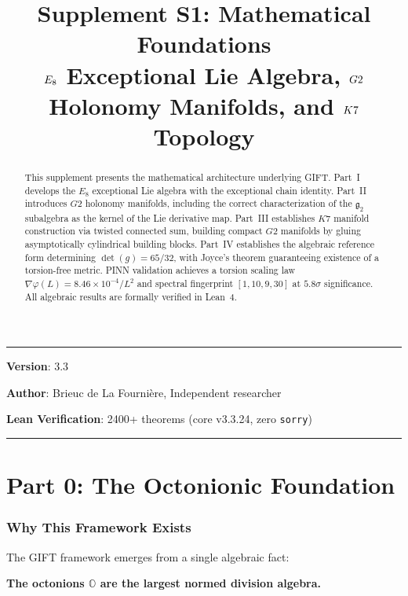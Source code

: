\documentclass[11pt,a4paper]{article}
\title{%
\LARGE\textbf{Supplement S1: Mathematical Foundations}\\[0.3em]
\Large $\E_8$ Exceptional Lie Algebra, $\Gtwo$ Holonomy Manifolds, and $\Kseven$ Topology
}
\author{}
\date{}
\newcommand{\E}{\mathrm{E}}
\newcommand{\Gtwo}{\mathrm{G}_2}
\newcommand{\Kseven}{K_7}
\def\Gtwo{G2}%
\def\Kseven{K7}%
\def\E{E}%
\begin{document}
\maketitle
\noindent\rule{\textwidth}{0.2pt}

\noindent\textbf{Version}: 3.3

\noindent\textbf{Author}: Brieuc de La Fourni\`ere, Independent researcher

\noindent\textbf{Lean Verification}: 2400+ theorems (core v3.3.24, zero \texttt{sorry})

\vfill

\begin{abstract}
This supplement presents the mathematical architecture underlying GIFT. Part~I develops the $\E_8$ exceptional Lie algebra with the exceptional chain identity. Part~II introduces $\Gtwo$ holonomy manifolds, including the correct characterization of the $\mathfrak{g}_2$ subalgebra as the kernel of the Lie derivative map. Part~III establishes $\Kseven$ manifold construction via twisted connected sum, building compact $\Gtwo$ manifolds by gluing asymptotically cylindrical building blocks. Part~IV establishes the algebraic reference form determining $\det(g) = 65/32$, with Joyce's theorem guaranteeing existence of a torsion-free metric. PINN validation achieves a torsion scaling law $\nabla\varphi(L) = 8.46 \times 10^{-4}/L^2$ and spectral fingerprint $[1, 10, 9, 30]$ at $5.8\sigma$ significance. All algebraic results are formally verified in Lean~4.
\end{abstract}

\vfill
\noindent\rule{\textwidth}{0.2pt}

\newpage
\tableofcontents

\newpage

\part*{Part 0: The Octonionic Foundation}

\section{Why This Framework Exists}

The GIFT framework emerges from a single algebraic fact:

\textbf{The octonions $\mathbb{O}$ are the largest normed division algebra.}
\end{document}
